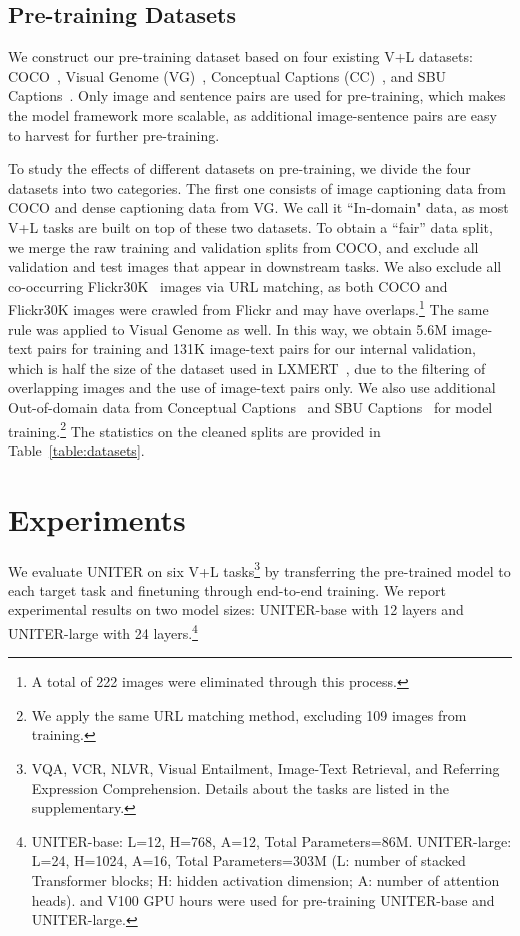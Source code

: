 \documentclass[runningheads]{llncs}
\begin{document}
\subsection{Pre-training Datasets}\label{subsec:datasets}
We construct our pre-training dataset based on four existing V+L datasets: COCO~\cite{lin2014microsoft},  Visual Genome (VG)~\cite{krishna2017visual}, Conceptual Captions (CC)~\cite{sharma2018conceptual}, and SBU Captions~\cite{ordonez2011im2text}.
Only image and sentence pairs are used for pre-training, which makes the model framework more scalable, as additional image-sentence pairs are easy to harvest for further pre-training.

To study the effects of different datasets on pre-training, we divide the four datasets into two categories.
The first one consists of image captioning data from COCO and dense captioning data from VG.
We call it ``In-domain" data, as most V+L tasks are built on top of these two datasets.
To obtain a ``fair'' data split, we merge the raw training and validation splits from COCO, and exclude all validation and test images that appear in downstream tasks.
We also exclude all co-occurring Flickr30K~\cite{plummer2015flickr30k} images via URL matching, as both COCO and Flickr30K images were crawled from Flickr and may have overlaps.\footnote{A total of 222 images were eliminated through this process.}
The same rule was applied to Visual Genome as well. In this way, we obtain 5.6M image-text pairs for training and 131K image-text pairs for our internal validation, which is half the size of the dataset used in LXMERT~\cite{tan2019lxmert}, due to the filtering of overlapping images and the use of image-text pairs only.
We also use additional Out-of-domain data from Conceptual Captions~\cite{sharma2018conceptual} and SBU Captions~\cite{ordonez2011im2text} for model training.\footnote{We apply the same URL matching method, excluding 109 images from training.} The statistics on the cleaned splits are provided in Table~\ref{table:datasets}.

 \section{Experiments}



We evaluate UNITER on six V+L tasks\footnote{VQA, VCR, NLVR, Visual Entailment, Image-Text Retrieval, and Referring Expression Comprehension. Details about the tasks are listed in the supplementary.}
by transferring the pre-trained model to each target task and finetuning through end-to-end training. 
We report experimental results on two model sizes: UNITER-base with 12 layers and UNITER-large with 24 layers.\footnote{UNITER-base: L=12, H=768, A=12, Total Parameters=86M. UNITER-large: L=24, H=1024, A=16, Total Parameters=303M (L: number of stacked Transformer blocks; H: hidden activation dimension; A: number of attention heads).  and  V100 GPU hours were used for pre-training UNITER-base and UNITER-large.}
\end{document}
